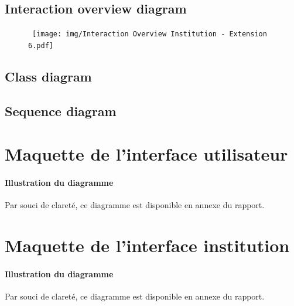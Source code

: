\documentclass[]{report}
\begin{document}


\newpage

\subsection{Interaction overview diagram}

\begin{figure}[h!]
\hspace{-3cm}
\hbox{
	\texttt{[image: img/Interaction Overview Institution - Extension 6.pdf]}
}
\end{figure}

\newpage

\subsection{Class diagram}

\newpage

\subsection{Sequence diagram}

\newpage




\section{Maquette de l'interface utilisateur}



\vspace*{\fill}

\paragraph{Illustration du diagramme} Par souci de clareté, ce diagramme est disponible en annexe du rapport.

\newpage


\section{Maquette de l'interface institution}



\vspace*{\fill}

\paragraph{Illustration du diagramme} Par souci de clareté, ce diagramme est disponible en annexe du rapport.
\end{document}
